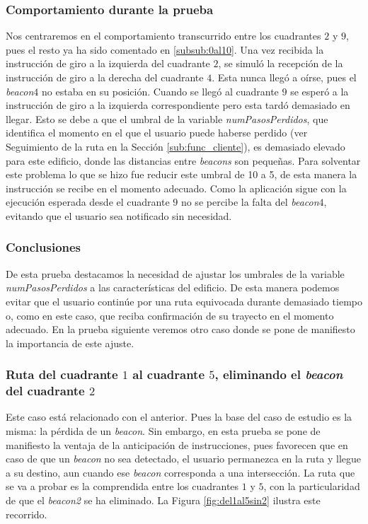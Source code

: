 \subsubsection*{Comportamiento durante la prueba}

Nos centraremos en el comportamiento transcurrido entre los cuadrantes $2$ y $9$, pues el resto ya ha sido comentado en \ref{subsub:0al10}. Una vez recibida la instrucción de giro a la izquierda del cuadrante $2$, se simuló la recepción de la instrucción de giro a la derecha del cuadrante $4$. Esta nunca llegó a oírse, pues el \textit{beacon$4$} no estaba en su posición. Cuando se llegó al cuadrante $9$ se esperó a la instrucción de giro a la izquierda correspondiente pero esta tardó demasiado en llegar. Esto se debe a que el umbral de la variable \textit{numPasosPerdidos}, que identifica el momento en el que el usuario puede haberse perdido (ver Seguimiento de la ruta en la Sección \ref{sub:func_cliente}), es demasiado elevado para este edificio, donde las distancias entre \textit{beacons} son pequeñas. Para solventar este problema lo que se hizo fue reducir este umbral de 10 a 5, de esta manera la instrucción se recibe en el momento adecuado. Como la aplicación sigue con la ejecución esperada desde el cuadrante $9$ no se percibe la falta del \textit{beacon$4$}, evitando que el usuario sea notificado sin necesidad.


\subsubsection*{Conclusiones}

De esta prueba destacamos la necesidad de ajustar los umbrales de la variable \textit{numPasosPerdidos} a las características del edificio. De esta manera podemos evitar que el usuario continúe por una ruta equivocada durante demasiado tiempo o, como en este caso, que reciba confirmación de su trayecto en el momento adecuado. En la prueba siguiente veremos otro caso donde se pone de manifiesto la importancia de este ajuste.


\subsubsection{Ruta del cuadrante $1$ al cuadrante $5$, eliminando el \textit{beacon} del cuadrante $2$}
\label{subsub:1al5sin2}

Este caso está relacionado con el anterior. Pues la base del caso de estudio es la misma: la pérdida de un \textit{beacon}. Sin embargo, en esta prueba se pone de manifiesto la ventaja de la anticipación de instrucciones, pues favorecen que en caso de que un \textit{beacon} no sea detectado, el usuario permanezca en la ruta y llegue a su destino, aun cuando ese \textit{beacon} corresponda a una intersección. La ruta que se va a probar es la comprendida entre los cuadrantes $1$ y $5$, con la particularidad de que el \textit{beacon2} se ha eliminado. La Figura \ref{fig:del1al5sin2} ilustra este recorrido.

